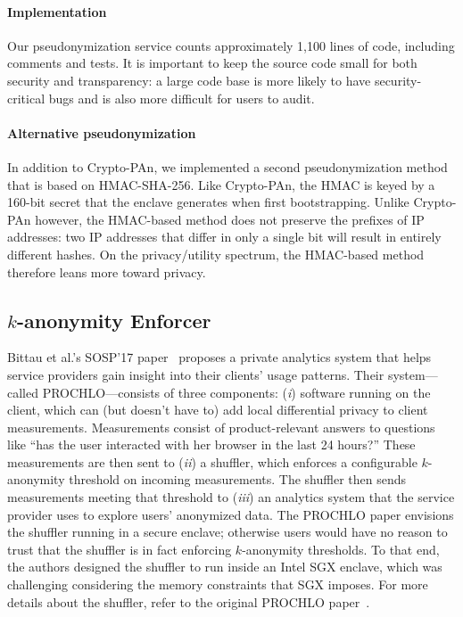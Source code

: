 \paragraph{Implementation}
Our pseudonymization service counts approximately 1,100 lines of code, including
comments and tests.  It is important to keep the source code small for both
security and transparency: a large code base is more likely to have
security-critical bugs and is also more difficult for users to audit.

\paragraph{Alternative pseudonymization}
In addition to Crypto-PAn, we implemented a second pseudonymization method that
is based on HMAC-SHA-256.  Like Crypto-PAn, the HMAC is keyed by a 160-bit
secret that the enclave generates when first bootstrapping.  Unlike Crypto-PAn
however, the HMAC-based method does not preserve the prefixes of IP addresses:
two IP addresses that differ in only a single bit will result in entirely
different hashes.  On the privacy/utility spectrum, the HMAC-based method
therefore leans more toward privacy.

\subsection{$k$-anonymity Enforcer}
\label{sec:shuffler}

Bittau et al.'s SOSP'17 paper~\cite{Bittau2017a} proposes a private analytics
system that helps service providers gain insight into their clients' usage
patterns.  Their system---called PROCHLO---consists of three components:
(\emph{i}) software running on the client, which can (but doesn't have to) add
local differential privacy to client measurements.  Measurements consist of
product-relevant answers to questions like ``has the user interacted with her
browser in the last 24 hours?'' These measurements are then sent to (\emph{ii})
a shuffler, which enforces a configurable $k$-anonymity threshold on incoming
measurements.  The shuffler then sends measurements meeting that threshold to
(\emph{iii}) an analytics system that the service provider uses to explore
users' anonymized data.  The PROCHLO paper envisions the shuffler running in a
secure enclave; otherwise users would have no reason to trust that the shuffler
is in fact enforcing $k$-anonymity thresholds.  To that end, the authors
designed the shuffler to run inside an Intel SGX enclave, which was challenging
considering the memory constraints that SGX imposes.  For more details about the
shuffler, refer to the original PROCHLO paper~\cite[\S~3.3]{Bittau2017a}.

